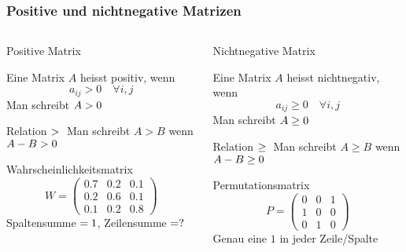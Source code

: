 %
%
%
\bgroup
\begin{frame}[t]
\setlength{\abovedisplayskip}{5pt}
\setlength{\belowdisplayskip}{5pt}
\frametitle{Positive und nichtnegative Matrizen}
\vspace{-20pt}
\begin{columns}[t,onlytextwidth]
\begin{column}{0.48\textwidth}
\begin{block}{Positive Matrix\strut}
Eine Matrix $A$ heisst positiv, wenn
\[
a_{ij} > 0\quad\forall i,j
\]
Man schreibt $A>0\mathstrut$
\end{block}
\begin{block}{Relation $>\mathstrut$}
Man schreibt $A>B$ wenn $A-B > 0\mathstrut$
\end{block}
\begin{block}{Wahrscheinlichkeitsmatrix}
\[
W=\begin{pmatrix}
0.7&0.2&0.1\\
0.2&0.6&0.1\\
0.1&0.2&0.8
\end{pmatrix}
\]
Spaltensumme$\mathstrut=1$, Zeilensumme$\mathstrut=?$
\end{block}
\end{column}
\begin{column}{0.48\textwidth}
\begin{block}{Nichtnegative Matrix\strut}
Eine Matrix $A$ heisst nichtnegativ, wenn
\[
a_{ij} \ge 0\quad\forall i,j
\]
Man schreibt $A\ge 0\mathstrut$
\end{block}
\begin{block}{Relation $\ge\mathstrut$}
Man schreibt $A\ge B$ wenn $A-B \ge 0\mathstrut$
\end{block}
\begin{block}{Permutationsmatrix}
\[
P=\begin{pmatrix}
0&0&1\\
1&0&0\\
0&1&0
\end{pmatrix}
\]
Genau eine $1$ in jeder Zeile/Spalte
\end{block}
\end{column}
\end{columns}
\end{frame}
\egroup
